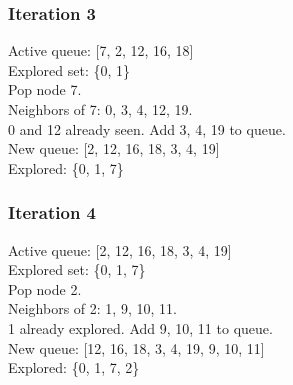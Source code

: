 \subsubsection*{Iteration 3}
Active queue: [7, 2, 12, 16, 18] \\
Explored set: \{0, 1\} \\
Pop node 7. \\
Neighbors of 7: 0, 3, 4, 12, 19. \\
0 and 12 already seen. Add 3, 4, 19 to queue. \\
New queue: [2, 12, 16, 18, 3, 4, 19] \\
Explored: \{0, 1, 7\}

\subsubsection*{Iteration 4}
Active queue: [2, 12, 16, 18, 3, 4, 19] \\
Explored set: \{0, 1, 7\} \\
Pop node 2. \\
Neighbors of 2: 1, 9, 10, 11. \\
1 already explored. Add 9, 10, 11 to queue. \\
New queue: [12, 16, 18, 3, 4, 19, 9, 10, 11] \\
Explored: \{0, 1, 7, 2\}

